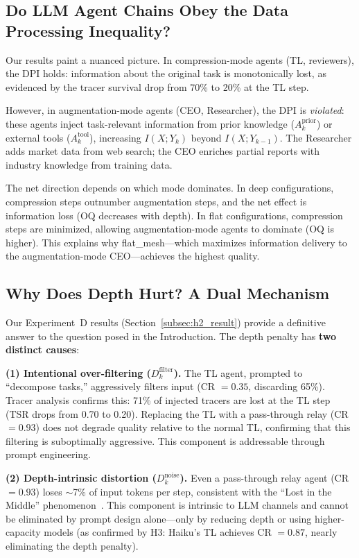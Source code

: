 \documentclass[conference]{IEEEtran}
\begin{document}
\subsection{Do LLM Agent Chains Obey the Data Processing Inequality?}

Our results paint a nuanced picture.
In compression-mode agents (TL, reviewers), the DPI holds: information about the original task is monotonically lost, as evidenced by the tracer survival drop from 70\% to 20\% at the TL step.

However, in augmentation-mode agents (CEO, Researcher), the DPI is \emph{violated}: these agents inject task-relevant information from prior knowledge ($A_k^{\text{prior}}$) or external tools ($A_k^{\text{tool}}$), increasing $I(X; Y_k)$ beyond $I(X; Y_{k-1})$.
The Researcher adds market data from web search; the CEO enriches partial reports with industry knowledge from training data.

The net direction depends on which mode dominates.
In deep configurations, compression steps outnumber augmentation steps, and the net effect is information loss (OQ decreases with depth).
In flat configurations, compression steps are minimized, allowing augmentation-mode agents to dominate (OQ is higher).
This explains why flat\_mesh---which maximizes information delivery to the augmentation-mode CEO---achieves the highest quality.

\subsection{Why Does Depth Hurt? A Dual Mechanism}

Our Experiment~D results (Section~\ref{subsec:h2_result}) provide a definitive answer to the question posed in the Introduction.
The depth penalty has \textbf{two distinct causes}:

\textbf{(1) Intentional over-filtering ($D_k^{\text{filter}}$).}
The TL agent, prompted to ``decompose tasks,'' aggressively filters input (CR $= 0.35$, discarding 65\%).
Tracer analysis confirms this: 71\% of injected tracers are lost at the TL step (TSR drops from 0.70 to 0.20).
Replacing the TL with a pass-through relay (CR $= 0.93$) does not degrade quality relative to the normal TL, confirming that this filtering is suboptimally aggressive.
This component is addressable through prompt engineering.

\textbf{(2) Depth-intrinsic distortion ($D_k^{\text{noise}}$).}
Even a pass-through relay agent (CR $= 0.93$) loses $\sim$7\% of input tokens per step, consistent with the ``Lost in the Middle'' phenomenon~\cite{liu2024lost}.
This component is intrinsic to LLM channels and cannot be eliminated by prompt design alone---only by reducing depth or using higher-capacity models (as confirmed by H3: Haiku's TL achieves CR $= 0.87$, nearly eliminating the depth penalty).
\end{document}
